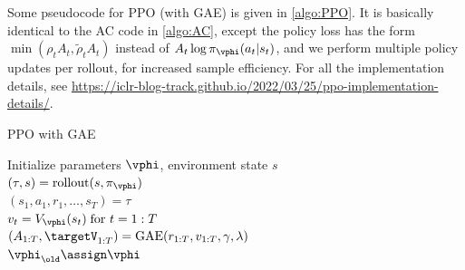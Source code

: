 Some pseudocode for PPO (with GAE)
is given in \cref{algo:PPO}.
It is basically identical to the AC code in \cref{algo:AC},
except the policy loss has the form
$\min(\rho_t A_t, \tilde{\rho}_t A_t)$
instead of
$A_t \log \pi_{\vphi}(a_t|s_t)$,
and we perform multiple policy updates per rollout,
for increased sample efficiency.
For all the implementation details, see
\url{https://iclr-blog-track.github.io/2022/03/25/ppo-implementation-details/}.


\begin{algorithm}
\dontprintsemicolon
\caption{PPO  with GAE}
\label{algo:PPO}
Initialize  parameters $\vphi$, 
environment state $s$\\
{
  $(\tau,s) = \text{rollout}(s, \pi_{\vphi})$ \\
  $(s_1,a_1,r_1,\ldots,s_T)= \tau$ \\
  $v_{t} = V_{\vphi}(s_{t}) \; \text{for } t=1:T$ \\
  $(A_{1:T}, \targetV_{1:T}) = \text{GAE}(r_{1:T}, v_{1:T}, \gamma, \lambda)$
  \\
  $\vphi_{\old} \assign \vphi$ \\
}
\end{algorithm}


